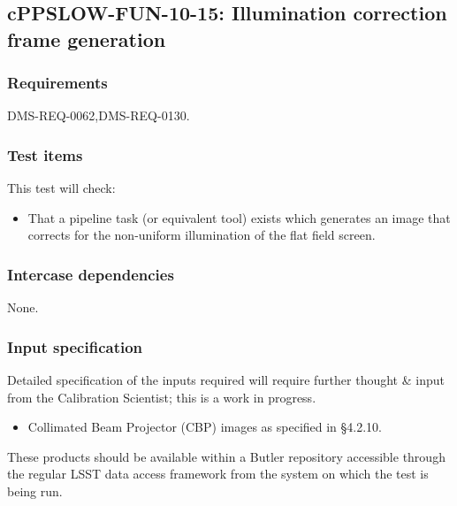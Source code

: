 \subsection{cPPSLOW-FUN-10-15: Illumination correction frame generation}
\label{cppslow-fun-10-15}

\subsubsection{Requirements}

DMS-REQ-0062,DMS-REQ-0130.

\subsubsection{Test items}

This test will check:

\begin{itemize}

  \item{That a pipeline task (or equivalent tool) exists which generates an
  image that corrects for the non-uniform illumination of the flat field
  screen.}

\end{itemize}

\subsubsection{Intercase dependencies}

None.

\subsubsection{Input specification}

\begin{note}
Detailed specification of the inputs required will require further thought \&
input from the Calibration Scientist; this is a work in progress.
\end{note}

\begin{itemize}

  \item{Collimated Beam Projector (CBP) images as specified in 
  \S4.2.10.}

\end{itemize}

These products should be available within a Butler repository accessible
through the regular LSST data access framework from the system on which the test
is being run.

